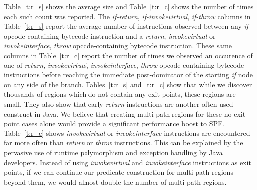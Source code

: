 %
Table~\ref{t:r_s} shows the average size and Table~\ref{t:r_c} shows the number of times each such count was reported.
%
The \textit{if-return}, \textit{if-invokevirtual}, \textit{if-throw} columns in Table~\ref{t:r_s} report the average number of instructions observed between any \textit{if} opcode-containing bytecode instruction and a \textit{return}, \textit{invokevirtual} or \textit{invokeinterface}, \textit{throw} opcode-containing bytecode instruction.
%
These same columns in Table~\ref{t:r_c} report the number of times we observed an occurence of one of \textit{return}, \textit{invokevirtual}, \textit{invokeinterface}, \textit{throw} opcode-containing bytecode instructions before reaching the immediate post-dominator of the starting \textit{if} node on any side of the branch.
%
Tables~\ref{t:r_s} and~\ref{t:r_c} show that while we discover thousands of regions which do not contain any exit points, these regions are small.
%
They also show that early \textit{return} instructions are another often used construct in Java.
%
We believe that creating multi-path regions for these no-exit-point cases alone would provide a significant performance boost to SPF.
%
Table~\ref{t:r_c} shows \textit{invokevirtual} or \textit{invokeinterface} instructions are encountered far more often than \textit{return} or \textit{throw} instructions.
%
This can be explained by the pervasive use of runtime polymorphism and exception handling by Java developers.
%
Instead of using \textit{invokevirtual} and \textit{invokeinterface}
instructions as exit points, if we can continue our predicate
construction for multi-path regions beyond them, we would almost double
the number of multi-path regions.
%

%
%
